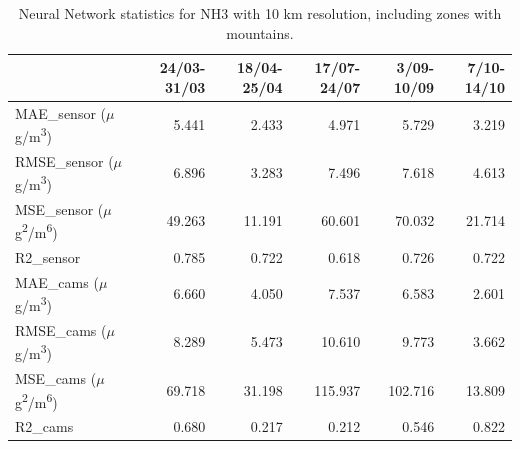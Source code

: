 \begin{table}[H]
\begin{tabular}{lrrrrr}
\toprule
 &  24/03-31/03 &  18/04-25/04 &  17/07-24/07 &  3/09-10/09 &  7/10-14/10 \\
\midrule
 MAE\_sensor ($\mu$g/m\textsuperscript{3})&        5.441 &        2.433 &        4.971 &       5.729 &       3.219 \\
RMSE\_sensor ($\mu$g/m\textsuperscript{3})&        6.896 &        3.283 &        7.496 &       7.618 &       4.613 \\
 MSE\_sensor ($\mu$g\textsuperscript{2}/m\textsuperscript{6})&       49.263 &       11.191 &       60.601 &      70.032 &      21.714 \\
  R2\_sensor &        0.785 &        0.722 &        0.618 &       0.726 &       0.722 \\
   MAE\_cams ($\mu$g/m\textsuperscript{3})&        6.660 &        4.050 &        7.537 &       6.583 &       2.601 \\
  RMSE\_cams ($\mu$g/m\textsuperscript{3})&        8.289 &        5.473 &       10.610 &       9.773 &       3.662 \\
   MSE\_cams ($\mu$g\textsuperscript{2}/m\textsuperscript{6})&       69.718 &       31.198 &      115.937 &     102.716 &      13.809 \\
    R2\_cams &        0.680 &        0.217 &        0.212 &       0.546 &       0.822 \\
\bottomrule
\end{tabular}
\caption{Neural Network statistics for NH3 with 10 km resolution, including zones with mountains.}
\end{table}

